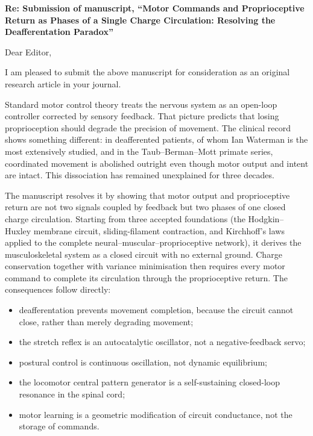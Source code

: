 


\textbf{Re: Submission of manuscript, ``Motor Commands and Proprioceptive Return as Phases of a Single Charge Circulation: Resolving the Deafferentation Paradox''}

Dear Editor,

I am pleased to submit the above manuscript for consideration as an original research article in your journal.

Standard motor control theory treats the nervous system as an open-loop controller corrected by sensory feedback. That picture predicts that losing proprioception should degrade the precision of movement. The clinical record shows something different: in deafferented patients, of whom Ian Waterman is the most extensively studied, and in the Taub--Berman--Mott primate series, coordinated movement is abolished outright even though motor output and intent are intact. This dissociation has remained unexplained for three decades.

The manuscript resolves it by showing that motor output and proprioceptive return are not two signals coupled by feedback but two phases of one closed charge circulation. Starting from three accepted foundations (the Hodgkin--Huxley membrane circuit, sliding-filament contraction, and Kirchhoff's laws applied to the complete neural--muscular--proprioceptive network), it derives the musculoskeletal system as a closed circuit with no external ground. Charge conservation together with variance minimisation then requires every motor command to complete its circulation through the proprioceptive return. The consequences follow directly:
\begin{itemize}[leftmargin=1.2em,itemsep=0.25em]
\item deafferentation prevents movement completion, because the circuit cannot close, rather than merely degrading movement;
\item the stretch reflex is an autocatalytic oscillator, not a negative-feedback servo;
\item postural control is continuous oscillation, not dynamic equilibrium;
\item the locomotor central pattern generator is a self-sustaining closed-loop resonance in the spinal cord;
\item motor learning is a geometric modification of circuit conductance, not the storage of commands.
\end{itemize}

